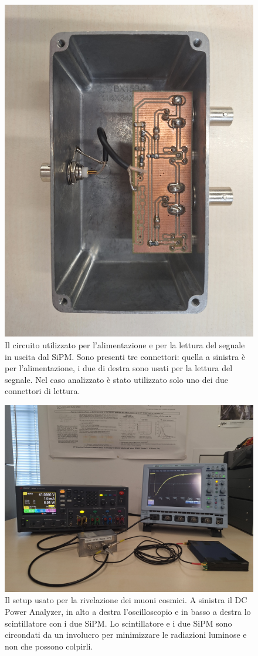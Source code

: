 \begin{figure}[h!]
    \centering
    \includegraphics[width=.75\linewidth]{img/circuito_lettura_alimentazione.jpg}
    \caption{Il circuito utilizzato per l'alimentazione e per la lettura del segnale in uscita dal SiPM. Sono presenti tre connettori:
        quella a sinistra è per l'alimentazione, i due di destra sono usati per la lettura del segnale. Nel caso analizzato è stato utilizzato
        solo uno dei due connettori di lettura.}
    \label{fig:circuito_lettura_alimentazione}
\end{figure}

\begin{figure}[h!]
    \centering
    \includegraphics[width=.75\linewidth]{img/setup_rilevazione_muoni.jpg}
    \caption{Il setup usato per la rivelazione dei muoni cosmici. A sinistra il DC Power Analyzer, in alto a destra l'oscilloscopio e in basso a
        destra lo scintillatore con i due SiPM. Lo scintillatore e i due SiPM sono circondati da un involucro per minimizzare le radiazioni luminose e
        non che possono colpirli.}
    \label{fig:setup_rivelazione_muoni}
\end{figure}

